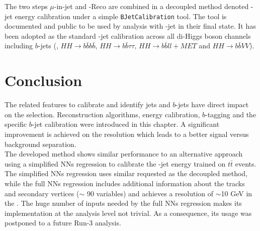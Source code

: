 The two steps $\mu$-in-jet and \pT-Reco are combined in a decoupled method denoted \bq-jet energy calibration under a simple \texttt{BJetCalibration} tool. The tool is documented and public to be used by analysis with \bq-jet in their final state. It has been adopted as the standard \bq-jet calibration across all di-Higgs boson channels including $b$-jets (\HHyybb, $HH\rightarrow b\bar{b}b\bar{b}$, $HH\rightarrow b\bar{b}\tau\tau$,  $HH\rightarrow b\bar{b}ll+MET$ and $HH\rightarrow b\bar{b}VV$).

\section{Conclusion}
\label{Jet:Conc}
The related features to calibrate and identify jets and $b$-jets have direct impact on the \HHyybb selection. Reconstruction algorithms, energy calibration, $b$-tagging and the specific $b$-jet calibration were introduced in this chapter. A significant improvement is achieved on the \mbb resolution which leads to a better signal versus background separation.\\
The developed method shows similar performance to an alternative approach using a simplified NNs regression to calibrate the \bq-jet energy trained on $t\bar{t}$ events. The simplified NNs regression uses similar requested as the decoupled method, while the full NNs regression includes additional information about the tracks and secondary vertices ($\sim$ 90 variables) and achieves a resolution of $\sim$10 GeV in the \mbb. The huge number of inputs needed by the full NNs regression makes its implementation at the analysis level not trivial. As a consequence, its usage was postponed to a future Run-3 analysis.